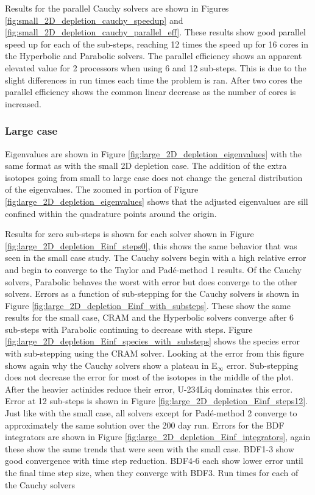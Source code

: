 Results for the parallel Cauchy solvers are shown in Figures \ref{fig:small_2D_depletion_cauchy_speedup} and \ref{fig:small_2D_depletion_cauchy_parallel_eff}. These results show good parallel speed up for each of the sub-steps, reaching 12 times the speed up for 16 cores in the Hyperbolic and Parabolic solvers. The parallel efficiency shows an apparent elevated value for 2 processors when using 6 and 12 sub-steps. This is due to the slight differences in run times each time the problem is ran. After two cores the parallel efficiency shows the common linear decrease as the number of cores is increased. 


\subsubsection{Large case}
Eigenvalues are shown in Figure \ref{fig:large_2D_depletion_eigenvalues} with the same format as with the small 2D depletion case. The addition of the extra isotopes going from small to large case does not change the general distribution of the eigenvalues. The zoomed in portion of Figure \ref{fig:large_2D_depletion_eigenvalues} shows that the adjusted eigenvalues are sill confined within the quadrature points around the origin. 

Results for zero sub-steps is shown for each solver shown in Figure \ref{fig:large_2D_depletion_Einf_steps0}, this shows the same behavior that was seen in the small case study. The Cauchy solvers begin with a high relative error and begin to converge to the Taylor and Pad\'e-method 1 results. Of the Cauchy solvers, Parabolic behaves the worst with error but does converge to the other solvers. Errors as a function of sub-stepping for the Cauchy solvers is shown in Figure \ref{fig:large_2D_depletion_Einf_with_substeps}. These show the same results for the small case, CRAM and the Hyperbolic solvers converge after 6 sub-steps with Parabolic continuing to decrease with steps. Figure \ref{fig:large_2D_depletion_Einf_species_with_substeps} shows the species error with sub-stepping using the CRAM solver. Looking at the error from this figure shows again why the Cauchy solvers show a plateau in E${}_{\infty}$ error. Sub-stepping does not decrease the error for most of the isotopes in the middle of the plot. After the heavier actinides reduce their error, U-234Liq dominates this error. Error at 12 sub-steps is shown in Figure \ref{fig:large_2D_depletion_Einf_steps12}. Just like with the small case, all solvers except for Pad\'e-method 2 converge to approximately the same solution over the 200 day run. Errors for the BDF integrators are shown in Figure \ref{fig:large_2D_depletion_Einf_integrators}, again these show the same trends that were seen with the small case. BDF1-3 show good convergence with time step reduction. BDF4-6 each show lower error until the final time step size, when they converge with BDF3. Run times for each of the Cauchy solvers 

